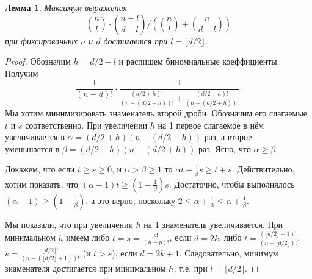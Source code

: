 \documentclass[12pt]{article}
\newtheorem{lemma}{Лемма}
\begin{document}
    \begin{lemma}
        \label{lm:middle}
        Максимум выражения
        $$
            \binom{n}{l}\cdot\binom{n-l}{d-l} / \left(\binom{n}{l} + \binom{n}{d-l}\right)
        $$
         при фиксированных $n$ и $d$ достигается при $l = \lfloor d/2 \rfloor$.
    \end{lemma}
    \begin{proof}
        Обозначим $h = d/2 - l$ и распишем биномиальные коеффициенты. Получим
        $$
            \frac{1}{(n-d)!}\cdot
            \frac{1}{\frac{(d/2+h)!}{(n-(d/2-h))!} + \frac{(d/2-h)!}{(n-(d/2+h))!}}.
        $$
        Мы хотим минимизировать знаменатель второй дроби. Обозначим его слагаемые $t$ и $s$ соответственно.
        При увеличении $h$ на 1 первое слагаемое в нём увеличивается в $\alpha = (d/2+h)(n-(d/2-h))$ раз,
        а второе~--- уменьшается в $\beta = (d/2-h)(n-(d/2+h))$ раз. Ясно, что $\alpha \ge \beta$.

        Докажем, что если $t\ge s\ge 0$, и $\alpha > \beta \ge 1$ то $\alpha t + \frac1\beta s\ge t+s$.
        Действительно, хотим показать, что $(\alpha - 1)t\ge(1-\frac1\beta)s$. Достаточно, чтобы выполнялось $(\alpha - 1)\ge(1-\frac1\beta)$,
        а это верно, поскольку $2 \le \alpha + \frac1\alpha \le \alpha + \frac1\beta$.

        Мы показали, что при увеличении $h$ на 1 знаменатель увеличивается.
        При минимальном $h$ имеем либо $t = s = \frac{p!}{(n-p)!}$, если $d = 2k$,
        либо $t = \frac{(\lfloor d/2 \rfloor + 1)!}{(n - \lfloor d/2 \rfloor)!}$,
        $s = \frac{\lfloor d/2 \rfloor!}{(n-(\lfloor d/2 \rfloor + 1))!}$ (и $t > s$),
        если $d = 2k + 1$.
        Следовательно, минимум знаменателя достигается при минимальном $h$, т.е. при $l = \lfloor d/2 \rfloor$.
    \end{proof}
\end{document}
